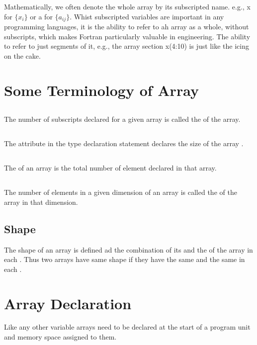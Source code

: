 \documentclass[class=book,crop=false]{standalone}
\begin{document}
Mathematically, we often denote the whole array by its subscripted name. e.g., x for $ \{x_i\} $ or a for $ \{a_{ij}\} $. Whist subscripted variables are important in any programming languages, it is the ability to refer to ah array as a whole, without subscripts, which makes Fortran particularly valuable in engineering. The ability to refer to just segments of it, e.g., the array section x(4:10) is just like the icing on the cake.
\section{Some Terminology of Array}
\subsection{}
The number of subscripts declared for a given array is called the  of the array.
\subsection{}
The  attribute in the type declaration statement declares the size of the array .
\subsection{}
The  of an array is the total number of element declared in that array.
\subsection{}
The number of elements in a given dimension of an array is called the  of the array in that dimension.
\subsection{Shape}
The shape of an array is defined ad the combination of its  and the  of the array in each . Thus two arrays have same shape if they have the same  and the same  in each .
\section{Array Declaration}
Like any other variable arrays need to be declared at the start of a program unit and memory space assigned to them.
\end{document}
